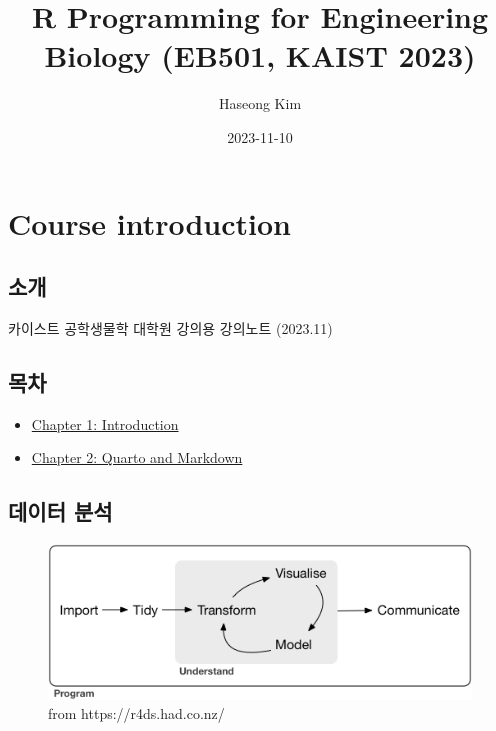 \documentclass[
  a4paper,
]{book}
\title{R Programming for Engineering Biology (EB501, KAIST 2023)}
\author{Haseong Kim}
\date{2023-11-10}
\providecommand{\tightlist}{%
  \setlength{\itemsep}{0pt}\setlength{\parskip}{0pt}}\usepackage{longtable,booktabs,array}
\renewcommand*\contentsname{Table of contents}
\newcommand\contentsname{Table of contents}
\begin{document}
\frontmatter
\maketitle
\ifdefined\Shaded\renewenvironment{Shaded}{\begin{tcolorbox}[boxrule=0pt, frame hidden, interior hidden, enhanced, borderline west={3pt}{0pt}{shadecolor}, sharp corners, breakable]}{\end{tcolorbox}}\fi

\renewcommand*\contentsname{Table of contents}
{
\setcounter{tocdepth}{2}
\tableofcontents
}
\mainmatter
{}

\hypertarget{course-introduction}{%
\chapter{Course introduction}\label{course-introduction}}

\hypertarget{uxc18cuxac1c}{%
\section{소개}\label{uxc18cuxac1c}}

카이스트 공학생물학 대학원 강의용 강의노트 (2023.11)

\hypertarget{uxbaa9uxcc28}{%
\section{목차}\label{uxbaa9uxcc28}}

\begin{itemize}
\tightlist
\item
  \protect\hyperlink{introduction}{Chapter 1: Introduction}
\item
  \protect\hyperlink{quarto-and-markdown}{Chapter 2: Quarto and
  Markdown}
\end{itemize}

\hypertarget{uxb370uxc774uxd130-uxbd84uxc11d}{%
\section{데이터 분석}\label{uxb370uxc774uxd130-uxbd84uxc11d}}

\begin{figure}

{\centering \includegraphics[width=5.66667in,height=\textheight]{images/07/data-science.png}

}

\caption{from https://r4ds.had.co.nz/}

\end{figure}
\end{document}
